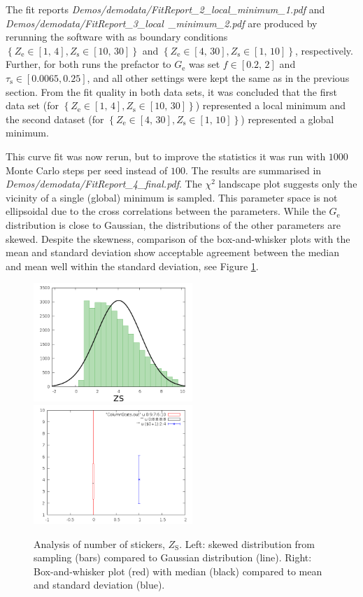 \documentclass[  superscriptaddress]{revtex4}
\begin{document}
The fit reports \emph{Demos/demodata/FitReport\_2\_local\_minimum\_1.pdf} and \emph{Demos/demodata/FitReport\_3\_local\ \_minimum\_2.pdf} are produced by rerunning the software with as boundary conditions $\left\{Z_\mathrm{e} \in [1,\, 4], Z_\mathrm{s} \in [10,\, 30]\right\}$ and $\left\{Z_\mathrm{e} \in [4,\, 30], Z_\mathrm{s} \in [1,\, 10]\right\}$, respectively.
Further, for both runs the prefactor to $G_\mathrm{e}$ was set $f \in [0.2,\, 2]$ and $\tau_\mathrm{s} \in [0.0065, 0.25]$, and all other settings were kept the same as in the previous section.
From the fit quality in both data sets, it was concluded that the first data set (for $\left\{Z_\mathrm{e} \in [1,\, 4], Z_\mathrm{s} \in [10,\, 30]\right\}$) represented a local minimum and the second dataset (for $\left\{Z_\mathrm{e} \in [4,\, 30], Z_\mathrm{s} \in [1,\, 10]\right\}$) represented a global minimum.

This curve fit was now rerun, but to improve the statistics it was run with $1000$ Monte Carlo steps per seed instead of $100$. The results are summarised in \emph{Demos/demodata/FitReport\_4\_final.pdf}.
The $\chi^2$ landscape plot suggests only the vicinity of a single (global) minimum is sampled.
This parameter space is not ellipsoidal due to the cross correlations between the parameters.
While the $G_\mathrm{e}$ distribution is close to Gaussian, the distributions of the other parameters are skewed.
Despite the skewness, comparison of the box-and-whisker plots with the mean and standard deviation show acceptable agreement between the median and mean well within the standard deviation, see Figure \ref{fig:skewed}.  

\begin{figure}
  \centering
  \includegraphics*[width=6cm]{../Demos/demodata/img/hist_ZS.png}
  \includegraphics*[width=6cm]{../Demos/demodata/img/stats_ZS.png}
  \caption{Analysis of number of stickers, $Z_\mathrm{S}$. Left: skewed distribution from sampling (bars) compared to Gaussian distribution (line). Right: Box-and-whisker plot (red) with median (black) compared to mean and standard deviation (blue).}
  \label{fig:skewed}
\end{figure}
\end{document}
